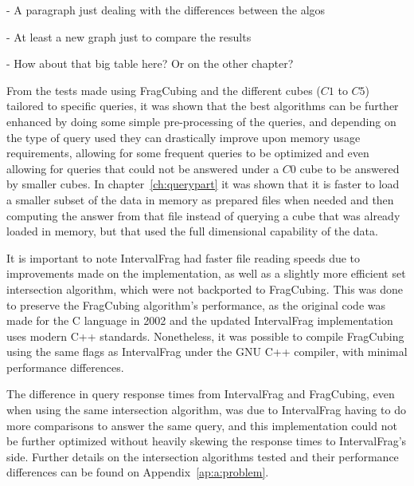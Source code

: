 - A paragraph just dealing with the differences between the algos

- At least a new graph just to compare the results

- How about that big table here? Or on the other chapter?

From the tests made using FragCubing and the different cubes ($C1$ to $C5$) tailored to specific queries, it was shown that the best algorithms can be further enhanced by doing some simple pre-processing of the queries, and depending on the type of query used they can drastically improve upon memory usage requirements, allowing for some frequent queries to be optimized and even allowing for queries that could not be answered under a $C0$ cube to be answered by smaller cubes.
In chapter~\ref{ch:querypart} it was shown that it is faster to load a smaller subset of the data in memory as prepared files when needed and then computing the answer from that file instead of querying a cube that was already loaded in memory, but that used the full dimensional capability of the data.

It is important to note IntervalFrag had faster file reading speeds due to improvements made on the implementation, as well as a slightly more efficient set intersection algorithm, which were not backported to FragCubing.
This was done to preserve the FragCubing algorithm's performance, as the original code was made for the C language in 2002 and the updated IntervalFrag implementation uses modern C++ standards.
Nonetheless, it was possible to compile FragCubing using the same flags as IntervalFrag under the GNU C++ compiler, with minimal performance differences.

The difference in query response times from IntervalFrag and FragCubing, even when using the same intersection algorithm, was due to IntervalFrag having to do more comparisons to answer the same query, and this implementation could not be further optimized without heavily skewing the response times to IntervalFrag's side.
Further details on the intersection algorithms tested and their performance differences can be found on Appendix~\ref{ap:a:problem}.


